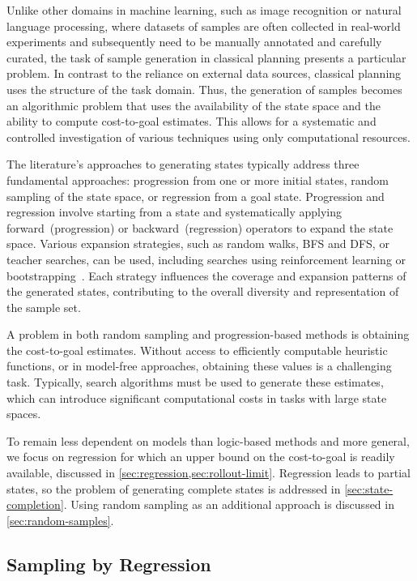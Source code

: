 Unlike other domains in machine learning, such as image recognition or natural language processing, where datasets of samples are often collected in real-world experiments and subsequently need to be manually annotated and carefully curated, the task of sample generation in classical planning presents a particular problem. In contrast to the reliance on external data sources, classical planning uses the structure of the task domain. Thus, the generation of samples becomes an algorithmic problem that uses the availability of the state space and the ability to compute cost-to-goal estimates. This allows for a systematic and controlled investigation of various techniques using only computational resources.

The literature's approaches to generating states typically address three fundamental approaches: progression from one or more initial states, random sampling of the state space, or regression from a goal state. Progression and regression involve starting from a state and systematically applying forward~(progression) or backward~(regression) operators to expand the state space. Various expansion strategies, such as random walks, BFS and DFS, or teacher searches, can be used, including searches using reinforcement learning or bootstrapping~\cite{arfaee2011learning}. Each strategy influences the coverage and expansion patterns of the generated states, contributing to the overall diversity and representation of the sample set.

A problem in both random sampling and progression-based methods is obtaining the cost-to-goal estimates. Without access to efficiently computable heuristic functions, or in model-free approaches, obtaining these values is a challenging task. Typically, search algorithms must be used to generate these estimates, which can introduce significant computational costs in tasks with large state spaces.

To remain less dependent on models than logic-based methods and more general, we focus on regression for which an upper bound on the cost-to-goal is readily available, discussed in \cref{sec:regression,sec:rollout-limit}. Regression leads to partial states, so the problem of generating complete states is addressed in \cref{sec:state-completion}. Using random sampling as an additional approach is discussed in \cref{sec:random-samples}.

\subsection{Sampling by Regression}
\label{sec:regression}

